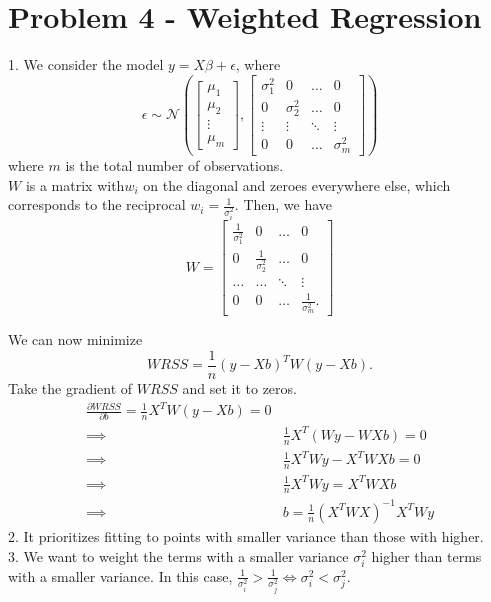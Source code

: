 \documentclass{article}
\begin{document}
\section*{Problem 4 - Weighted Regression}
1. We consider the model $y = X\beta + \epsilon$, where 
\begin{equation*}
	\epsilon \sim \mathcal{N} \left( \begin{bmatrix} \mu_1 \\ \mu_2 \\ \vdots \\ \mu_m \end{bmatrix},
	\begin{bmatrix} 
		\sigma_1^2 &0 &\dots & 0 \\
		0 & \sigma_2^2 &\dots& 0 \\ 
		\vdots & \vdots & \ddots & \vdots \\
		0 & 0 & \dots & \sigma_m^2
	\end{bmatrix} \right)
\end{equation*}
where $m$ is the total number of observations.\\

$W$ is a matrix with$w_i$ on the diagonal and zeroes everywhere else, which corresponds to the reciprocal $w_i = \frac{1}{\sigma_i^2}$. Then, we have 
\begin{equation*}
	W = 
	\begin{bmatrix}
		\frac{1}{\sigma_1^2} & 0 & \dots & 0 \\
		0 & \frac{1}{\sigma_2^2} & \dots & 0 \\
		\dots & \dots & \ddots & \vdots \\
		0 & 0 & \dots & \frac{1}{\sigma_m^2}.
	\end{bmatrix}
\end{equation*}

We can now minimize 
\begin{equation*}
	WRSS = \frac{1}{n}(y - Xb)^TW(y - Xb).
\end{equation*}
Take the gradient of $WRSS$ and set it to zeros.
\begin{align*}
	\frac{\partial WRSS}{\partial b}  = \frac{1}{n}X^T W (y-Xb)  = 0 \\
		 \implies &\frac{1}{n}X^T (Wy - WXb) = 0 \\
		  \implies &\frac{1}{n}X^TWy - X^TWXb = 0 \\
		  \implies& \frac{1}{n}X^TWy = X^TWXb \\
		 \implies &b = \frac{1}{n}\left(X^TWX\right)^{-1} X^TWy
\end{align*}
2. It prioritizes fitting to points with smaller variance than those with higher. \\

3. We want to weight the terms with a smaller variance $\sigma^2_i$ higher than terms with a smaller variance. 
	In this case, $\frac{1}{\sigma^2_i} > \frac{1}{\sigma^2_j} \iff \sigma^2_i < \sigma^2_j$.
\end{document}
